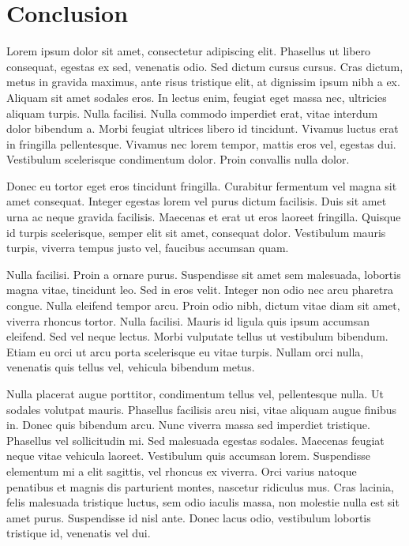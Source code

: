 \chapter{Conclusion}

Lorem ipsum dolor sit amet, consectetur adipiscing elit. Phasellus ut libero consequat, egestas ex sed, venenatis odio. Sed dictum cursus cursus. Cras dictum, metus in gravida maximus, ante risus tristique elit, at dignissim ipsum nibh a ex. Aliquam sit amet sodales eros. In lectus enim, feugiat eget massa nec, ultricies aliquam turpis. Nulla facilisi. Nulla commodo imperdiet erat, vitae interdum dolor bibendum a. Morbi feugiat ultrices libero id tincidunt. Vivamus luctus erat in fringilla pellentesque. Vivamus nec lorem tempor, mattis eros vel, egestas dui. Vestibulum scelerisque condimentum dolor. Proin convallis nulla dolor.

Donec eu tortor eget eros tincidunt fringilla. Curabitur fermentum vel magna sit amet consequat. Integer egestas lorem vel purus dictum facilisis. Duis sit amet urna ac neque gravida facilisis. Maecenas et erat ut eros laoreet fringilla. Quisque id turpis scelerisque, semper elit sit amet, consequat dolor. Vestibulum mauris turpis, viverra tempus justo vel, faucibus accumsan quam.

Nulla facilisi. Proin a ornare purus. Suspendisse sit amet sem malesuada, lobortis magna vitae, tincidunt leo. Sed in eros velit. Integer non odio nec arcu pharetra congue. Nulla eleifend tempor arcu. Proin odio nibh, dictum vitae diam sit amet, viverra rhoncus tortor. Nulla facilisi. Mauris id ligula quis ipsum accumsan eleifend. Sed vel neque lectus. Morbi vulputate tellus ut vestibulum bibendum. Etiam eu orci ut arcu porta scelerisque eu vitae turpis. Nullam orci nulla, venenatis quis tellus vel, vehicula bibendum metus.

Nulla placerat augue porttitor, condimentum tellus vel, pellentesque nulla. Ut sodales volutpat mauris. Phasellus facilisis arcu nisi, vitae aliquam augue finibus in. Donec quis bibendum arcu. Nunc viverra massa sed imperdiet tristique. Phasellus vel sollicitudin mi. Sed malesuada egestas sodales. Maecenas feugiat neque vitae vehicula laoreet. Vestibulum quis accumsan lorem. Suspendisse elementum mi a elit sagittis, vel rhoncus ex viverra. Orci varius natoque penatibus et magnis dis parturient montes, nascetur ridiculus mus. Cras lacinia, felis malesuada tristique luctus, sem odio iaculis massa, non molestie nulla est sit amet purus. Suspendisse id nisl ante. Donec lacus odio, vestibulum lobortis tristique id, venenatis vel dui.

